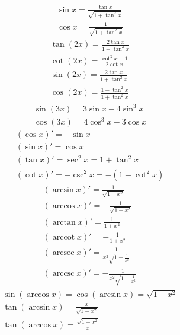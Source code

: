 \documentclass{article}
\DeclareMathOperator{\arcsec}{arcsec}
\DeclareMathOperator{\arccot}{arccot}
\DeclareMathOperator{\arccsc}{arccsc}
\begin{document}
\begin{gather*}
    \sin x = \frac{\tan x}{\sqrt{1+\tan^2 x}} \\
    \cos x = \frac{1}{\sqrt{1+\tan^2 x}}
\end{gather*}
\begin{gather*}
    \tan(2x) = \frac{2\tan x}{1-\tan^2x} \\
    \cot(2x) = \frac{\cot^2x - 1}{2\cot x} \\
    \sin(2x) = \frac{2\tan x}{1 + \tan^2x} \\
    \cos(2x) = \frac{1-\tan^2x}{1+\tan^2x}
\end{gather*}
\begin{gather*}
    \sin(3x) = 3\sin x - 4\sin^3x \\
    \cos(3x) = 4\cos^3x - 3\cos x
\end{gather*}
\begin{gather*}
    (\cos x)' = -\sin x \\
    (\sin x)' = \cos x \\
    (\tan x)' = \sec^2x = 1 + \tan^2x \\
    (\cot x)' = -\csc^2x = -(1 + \cot^2x)
\end{gather*}
\begin{gather*}
    (\arcsin x)' = \frac{1}{\sqrt{1-x^2}} \\
    (\arccos x)' = -\frac{1}{\sqrt{1-x^2}} \\
    (\arctan x)' = \frac{1}{1+x^2} \\
    (\arccot x)' = -\frac{1}{1+x^2} \\
    (\arcsec x)' = \frac{1}{x^2\sqrt{1-\frac{1}{x^2}}} \\
    (\arccsc x)' = -\frac{1}{x^2\sqrt{1-\frac{1}{x^2}}} 
\end{gather*}
\begin{gather*}
    \sin(\arccos x) = \cos(\arcsin x) = \sqrt{1-x^2} \\
    \tan(\arcsin x) = \frac{x}{\sqrt{1-x^2}} \\
    \tan(\arccos x) = \frac{\sqrt{1-x^2}}{x} 
\end{gather*}
\begin{gather}
    
\end{gather}
 
\end{document}
